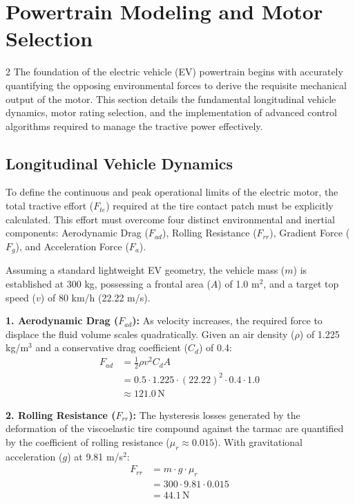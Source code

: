 \section{Powertrain Modeling and Motor Selection}

\begin{multicols}{2}
The foundation of the electric vehicle (EV) powertrain begins with accurately quantifying the opposing environmental forces to derive the requisite mechanical output of the motor. This section details the fundamental longitudinal vehicle dynamics, motor rating selection, and the implementation of advanced control algorithms required to manage the tractive power effectively.

\subsection{Longitudinal Vehicle Dynamics}

To define the continuous and peak operational limits of the electric motor, the total tractive effort ($F_{te}$) required at the tire contact patch must be explicitly calculated. This effort must overcome four distinct environmental and inertial components: Aerodynamic Drag ($F_{ad}$), Rolling Resistance ($F_{rr}$), Gradient Force ($F_{g}$), and Acceleration Force ($F_{a}$).

Assuming a standard lightweight EV geometry, the vehicle mass ($m$) is established at 300 kg, possessing a frontal area ($A$) of 1.0 m$^2$, and a target top speed ($v$) of 80 km/h (22.22 m/s). 

\textbf{1. Aerodynamic Drag ($F_{ad}$):} As velocity increases, the required force to displace the fluid volume scales quadratically. Given an air density ($\rho$) of 1.225 kg/m$^3$ and a conservative drag coefficient ($C_d$) of 0.4:
\begin{equation} \label{eq:aero_drag}
\begin{split}
F_{ad} &= \frac{1}{2} \rho v^2 C_d A \\
&= 0.5 \cdot 1.225 \cdot (22.22)^2 \cdot 0.4 \cdot 1.0 \\
&\approx 121.0\,\mathrm{N}
\end{split}
\end{equation}

\textbf{2. Rolling Resistance ($F_{rr}$):} The hysteresis losses generated by the deformation of the viscoelastic tire compound against the tarmac are quantified by the coefficient of rolling resistance ($\mu_r \approx 0.015$). With gravitational acceleration ($g$) at 9.81 m/s$^2$:
\begin{equation} \label{eq:rolling_res}
\begin{split}
F_{rr} &= m \cdot g \cdot \mu_r \\
&= 300 \cdot 9.81 \cdot 0.015 \\
&= 44.1\,\mathrm{N}
\end{split}
\end{equation}


\end{multicols}
